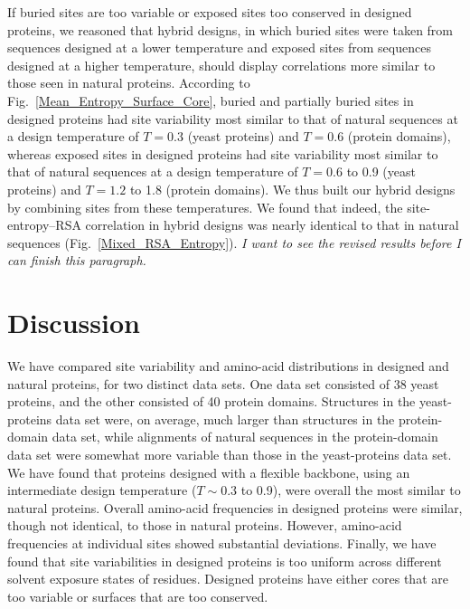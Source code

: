 \documentclass[12pt]{article}
\begin{document}
If buried sites are too variable or exposed sites too conserved in designed proteins, we reasoned that hybrid designs, in which buried sites were taken from sequences designed at a lower temperature and exposed sites from sequences designed at a higher temperature, should display correlations more similar to those seen in natural proteins. According to Fig.~\ref{Mean_Entropy_Surface_Core}, buried and partially buried sites in designed proteins had site variability most similar to that of natural sequences at a design temperature of $T=0.3$ (yeast proteins) and $T=0.6$ (protein domains), whereas exposed sites in designed proteins had site variability most similar to that of natural sequences at a design temperature of $T=0.6$ to 0.9 (yeast proteins) and $T=1.2$ to 1.8 (protein domains). We thus built our hybrid designs by combining sites from these temperatures. We found that indeed, the site-entropy--RSA correlation in hybrid designs was nearly identical to that in natural sequences (Fig.~\ref{Mixed_RSA_Entropy}). {\color{blue}\emph{I want to see the revised results before I can finish this paragraph.}}




\section{Discussion}

We have compared site variability and amino-acid distributions in designed and natural proteins, for two distinct data sets. One data set consisted of 38 yeast proteins, and the other consisted of 40 protein domains. Structures in the yeast-proteins data set were, on average, much larger than structures in the protein-domain data set, while alignments of natural sequences in the protein-domain data set were somewhat more variable than those in the yeast-proteins data set. We have found that proteins designed with a flexible backbone, using an intermediate design temperature ($T\sim0.3$ to 0.9), were overall the most similar to natural proteins. Overall amino-acid frequencies in designed proteins were similar, though not identical, to those in natural proteins. However, amino-acid frequencies at individual sites showed substantial deviations. Finally, we have found that site variabilities in designed proteins is too uniform across different solvent exposure states of residues. Designed proteins have either cores that are too variable or surfaces that are too conserved.
\end{document}
